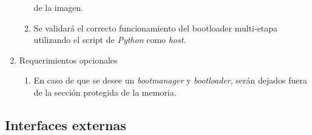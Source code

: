 \documentclass[12pt,a4paper]{article}
\begin{document}
\begin{enumerate}
\begin{enumerate}
			de la imagen.
			\item Se validará el correcto funcionamiento del bootloader multi-etapa utilizando el script de \textit{Python} como \textit{host}.
		\end{enumerate}
	\item Requerimientos opcionales
		\begin{enumerate}
			\item En caso de que se desee un \textit{bootmanager} y \textit{bootloader}, serán dejados fuera de la sección protegida de la memoria.
		\end{enumerate}
\end{enumerate}


\subsection{Interfaces externas}
\label{sec:external_interfaces}
\end{document}
